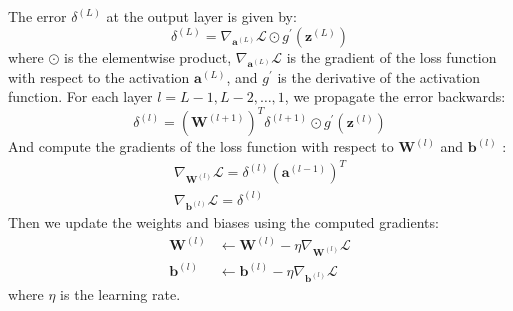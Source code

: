 The error $\delta^{(L)}$ at the output layer is given by:
$$
\delta^{(L)}=\nabla_{\mathbf{a}^{(L)}} \mathcal{L} \odot g^{\prime}\left(\mathbf{z}^{(L)}\right)
$$
where $\odot$ is the elementwise product, $\nabla_{\mathbf{a}^{(L)}} \mathcal{L}$ is the gradient of the loss function with respect to the activation $\mathbf{a}^{(L)}$, and $g^{\prime}$ is the derivative of the activation function. For each layer $l=L-1, L-2, \ldots, 1$, we propagate the error backwards:
$$
    \delta^{(l)}=\left(\mathbf{W}^{(l+1)}\right)^T \delta^{(l+1)} \odot g^{\prime}\left(\mathbf{z}^{(l)}\right)
$$
And compute the gradients of the loss function with respect to $\mathbf{W}^{(l)}$ and $\mathbf{b}^{(l)}$ :
$$
\begin{gathered}
\nabla_{\mathbf{W}^{(l)}} \mathcal{L}=\delta^{(l)}\left(\mathbf{a}^{(l-1)}\right)^T \\
\nabla_{\mathbf{b}^{(l)}} \mathcal{L}=\delta^{(l)}
\end{gathered}
$$
Then we update the weights and biases using the computed gradients:
$$
\begin{aligned}
\mathbf{W}^{(l)} & \leftarrow \mathbf{W}^{(l)}-\eta \nabla_{\mathbf{W}^{(l)}} \mathcal{L} \\
\mathbf{b}^{(l)} & \leftarrow \mathbf{b}^{(l)}-\eta \nabla_{\mathbf{b}^{(l)}} \mathcal{L}
\end{aligned}
$$
where $\eta$ is the learning rate.
